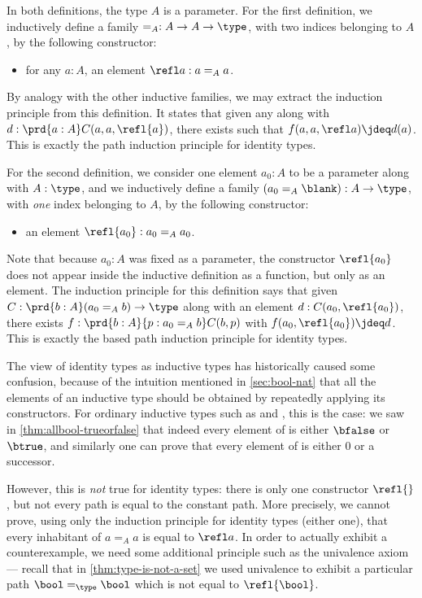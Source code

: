 In both definitions, the type $A$ is a parameter.
For the first definition, we inductively define a family $=_A : A\to A\to \type$, with two indices belonging to $A$, by the following constructor:
\begin{itemize}
\item for any $a:A$, an element $\refl a : a=_A a$.
\end{itemize}
By analogy with the other inductive families, we may extract the induction principle from this definition.
It states that given any  along with $d:\prd{a:A} C(a,a,\refl{a})$, there exists  such that $f(a,a,\refl a)\jdeq d(a)$.
This is exactly the path induction principle for identity types.

For the second definition, we consider one element $a_0:A$ to be a parameter along with $A:\type$, and we inductively define a family $(a_0 =_A \blank):A\to \type$, with \emph{one} index belonging to $A$, by the following constructor:
\begin{itemize}
\item an element $\refl{a_0} : a_0 =_A a_0$.
\end{itemize}
Note that because $a_0:A$ was fixed as a parameter, the constructor $\refl{a_0}$ does not appear inside the inductive definition as a function, but only as an element.
The induction principle for this definition says that given $C:\prd{b:A} (a_0 =_A b) \to \type$ along with an element $d:C(a_0,\refl{a_0})$, there exists $f:\prd{b:A}{p:a_0 =_A b} C(b,p)$ with $f(a_0,\refl{a_0})\jdeq d$.
This is exactly the based path induction principle for identity types.

The view of identity types as inductive types has historically caused some confusion, because of the intuition mentioned in \cref{sec:bool-nat} that all the elements of an inductive type should be obtained by repeatedly applying its constructors.
For ordinary inductive types such as \bool and \nat, this is the case: we saw in \cref{thm:allbool-trueorfalse} that indeed every element of \bool is either $\bfalse$ or $\btrue$, and similarly one can prove that every element of \nat is either $0$ or a successor.

However, this is \emph{not} true for identity types: there is only one constructor $\refl{}$, but not every path is equal to the constant path.
More precisely, we cannot prove, using only the induction principle for identity types (either one), that every inhabitant of $a=_A a$ is equal to $\refl a$.
In order to actually exhibit a counterexample, we need some additional principle such as the univalence axiom --- recall that in \cref{thm:type-is-not-a-set} we used univalence to exhibit a particular path $\bool=_\type\bool$ which is not equal to $\refl{\bool}$.

